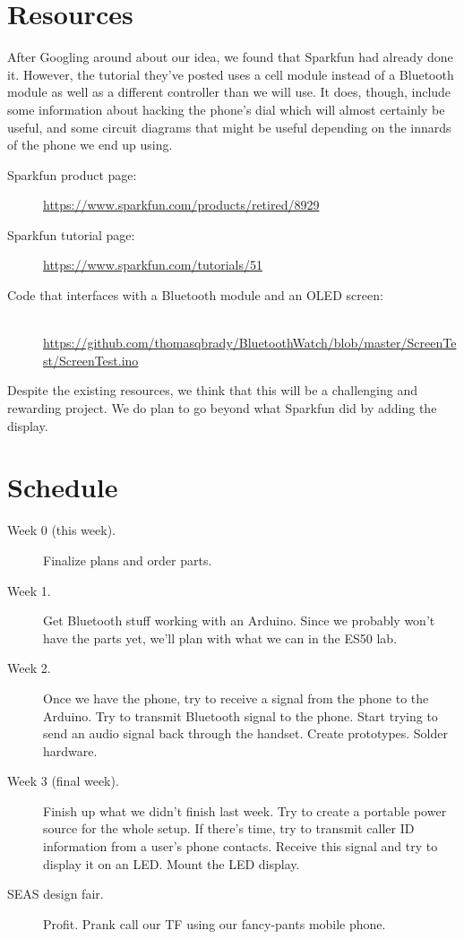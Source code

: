 \documentclass[11pt]{article}
\begin{document}
    \section{Resources}
    After Googling around about our idea, we found that Sparkfun had already done it. However, the tutorial they've posted uses a cell module instead of a Bluetooth module as well as a different controller than we will use. It does, though, include some information about hacking the phone's dial which will almost certainly be useful, and some circuit diagrams that might be useful depending on the innards of the phone we end up using.

    \begin{description}
        \item[Sparkfun product page:] \url{https://www.sparkfun.com/products/retired/8929}
        \item[Sparkfun tutorial page:] \url{https://www.sparkfun.com/tutorials/51}
        \item[Code that interfaces with a Bluetooth module and an OLED screen:]\mbox{}\\
        \url{https://github.com/thomasqbrady/BluetoothWatch/blob/master/ScreenTest/ScreenTest.ino}
    \end{description}

    Despite the existing resources, we think that this will be a challenging and rewarding project. We do plan to go beyond what Sparkfun did by adding the display.

    \section{Schedule}
        \begin{description}
            \item[Week 0 (this week).] Finalize plans and order parts.
            \item[Week 1.] Get Bluetooth stuff working with an Arduino. Since we probably won't have the parts yet, we'll plan with what we can in the ES50 lab.
            \item[Week 2.] Once we have the phone, try to receive a signal from the phone to the Arduino. Try to transmit Bluetooth signal to the phone. Start trying to send an audio signal back through the handset. Create prototypes. Solder hardware.
            \item[Week 3 (final week).] Finish up what we didn't finish last week. Try to create a portable power source for the whole setup. If there's time, try to transmit caller ID information from a user's phone contacts. Receive this signal and try to display it on an LED. Mount the LED display.
            \item[SEAS design fair.] Profit. Prank call our TF using our fancy-pants mobile phone.
        \end{description}
\end{document}

